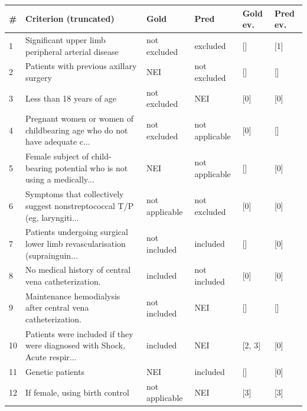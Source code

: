 \begin{tabular}{p{0.4cm}p{6.5cm}p{2.3cm}p{2.3cm}p{1.4cm}p{1.4cm}}\toprule \# & Criterion (truncated) & Gold & Pred & Gold ev. & Pred ev.\\\midrule
1 & Significant upper limb peripheral arterial disease & not excluded & excluded & [] & [1]\\
2 & Patients with previous axillary surgery & NEI & not excluded & [] & []\\
3 & Less than 18 years of age & not excluded & NEI & [0] & [0]\\
4 & Pregnant women or women of childbearing age who do not have adequate c... & not excluded & not applicable & [0] & []\\
5 & Female subject of child-bearing potential who is not using a medically... & NEI & not applicable & [] & [0]\\
6 & Symptoms that collectively suggest nonstreptococcal T/P (eg, laryngiti... & not applicable & not excluded & [0] & [0]\\
7 & Patients undergoing surgical lower limb revascularisation (suprainguin... & not included & included & [] & [0]\\
8 & No medical history of central vena catheterization. & included & not included & [0] & [0]\\
9 & Maintenance hemodialysis after central vena catheterization. & not included & NEI & [] & []\\
10 & Patients were included if they were diagnosed with Shock, Acute respir... & included & NEI & [2, 3] & [0]\\
11 & Genetic patients & NEI & included & [] & [0]\\
12 & If female, using birth control & not applicable & NEI & [3] & [3]\\
\bottomrule\end{tabular}